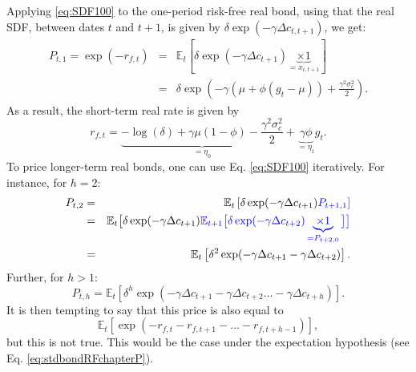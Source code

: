 \documentclass[
  12pt,
]{book}
\theoremstyle{definition}
\theoremstyle{definition}
\theoremstyle{definition}
\theoremstyle{definition}
\theoremstyle{remark}
\begin{document}
Applying \eqref{eq:SDF100} to the one-period risk-free real bond, using that the real SDF, between dates \(t\) and \(t+1\), is given by \(\delta\exp(-\gamma \Delta c_{t,t+1})\), we get:
\begin{eqnarray*}
P_{t,1} = \exp(-r_{f,t}) &=& \mathbb{E}_t \left[ \delta \exp(-\gamma \Delta c_{t+1}) \underbrace{\times 1}_{= x_{i,t+1}} \right]\\
&=& \delta \exp\left(-\gamma(\mu + \phi (g_t - \mu))+\frac{\gamma^2\sigma_c^2}{2}\right).
\end{eqnarray*}
As a result, the short-term real rate is given by
\begin{equation}
r_{f,t} = \underbrace{- \log(\delta) + \gamma \mu (1-\phi)  - \frac{\gamma^2\sigma_c^2}{2}}_{=\eta_0} + \underbrace{\gamma \phi}_{=\eta_1} g_t.\label{eq:rCCAPM}
\end{equation}
To price longer-term real bonds, one can use Eq. \eqref{eq:SDF100} iteratively. For instance, for \(h=2\):
\begin{eqnarray*}
P_{t,2} &=&  \mathbb{E}_t \left[ \delta \exp(-\gamma \Delta c_{t+1}) \color{blue}{P_{t+1,1}} \right]\\
&=& \mathbb{E}_t \big[ \delta \exp(-\gamma \Delta c_{t+1}) \color{blue}{\mathbb{E}_{t+1} \big[ \delta \exp(-\gamma \Delta c_{t+2}) \underbrace{\times 1}_{=P_{t+2,0}} \big]} \big]\\
&=& \mathbb{E}_t \left[ \delta^2 \exp(-\gamma \Delta c_{t+1} - \gamma \Delta c_{t+2}) \right].
\end{eqnarray*}
Further, for \(h>1\):
\begin{equation}
P_{t,h} = \mathbb{E}_t \left[ \delta^h \exp(-\gamma \Delta c_{t+1} - \gamma \Delta c_{t+2} \dots - \gamma \Delta c_{t+h}) \right].\label{eq:PthCCAPM}
\end{equation}
It is then tempting to say that this price is also equal to
\begin{equation}
\mathbb{E}_t \left[ \exp(- r_{f,t} - r_{f,t+1} - \dots - r_{f,t+h-1}) \right],\label{eq:CCAPMEH}
\end{equation}
but this is not true. This would be the case under the expectation hypothesis (see Eq. \eqref{eq:stdbondRFchapterP}).
\end{document}
